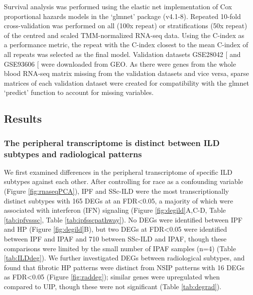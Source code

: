 \documentclass[
]{article}
\begin{document}
Survival analysis was performed using the elastic net implementation of Cox proportional hazards models in the `glmnet' package (v4.1-8). Repeated 10-fold cross-validation was performed on all (100x repeat) or stratifications (50x repeat) of the centred and scaled TMM-normalized RNA-seq data. Using the C-index as a performance metric, the repeat with the C-index closest to the mean C-index of all repeats was selected as the final model. Validation datasets GSE28042 {[}\citeproc{ref-herazo-maya_peripheral_2013}{59}{]} and GSE93606 {[}\citeproc{ref-molyneaux_host-microbial_2017}{55}{]} were downloaded from GEO. As there were genes from the whole blood RNA-seq matrix missing from the validation datasets and vice versa, sparse matrices of each validation dataset were created for compatibility with the glmnet `predict' function to account for missing variables.

\subsection{Results}\label{results-2}

\subsubsection{The peripheral transcriptome is distinct between ILD subtypes and radiological patterns}\label{the-peripheral-transcriptome-is-distinct-between-ild-subtypes-and-radiological-patterns}

We first examined differences in the peripheral transcriptome of specific ILD subtypes against each other. After controlling for race as a confounding variable (Figure \ref{fig:rnaseqPCA}), IPF and SSc-ILD were the most transcriptionally distinct subtypes with 165 DEGs at an FDR\textless0.05, a majority of which were associated with interferon (IFN) signaling (Figure \ref{fig:degild}A,C-D, Table \ref{tab:ipfvsssc}, Table \ref{tab:ipfsscpathway}). No DEGs were identified between IPF and HP (Figure \ref{fig:degild}B), but two DEGs at FDR\textless0.05 were identified between IPF and IPAF and 710 between SSc-ILD and IPAF, though these comparisons were limited by the small number of IPAF samples (n=4) (Table \ref{tab:ILDdeg}). We further investigated DEGs between radiological subtypes, and found that fibrotic HP patterns were distinct from NSIP patterns with 16 DEGs as FDR\textless0.05 (Figure \ref{fig:raddeg}); similar genes were upregulated when compared to UIP, though these were not significant (Table \ref{tab:degrad}).
\end{document}
